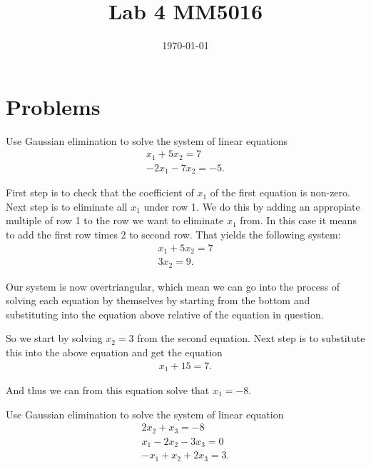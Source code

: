 \documentclass[10pt]{article}
\date{\today}
\title{Lab 4 MM5016}
\begin{document}
\maketitle


\section{Problems}
\label{sec:org0d400bd}

\begin{exercise}[System 1]  \label{exe:System_1}
Use Gaussian elimination to solve the system of linear equations
\begin{align*}
x_1 + 5x_2 = 7 \\
-2x_1 -7x_2 = -5
.
\end{align*}
\end{exercise}
\begin{solution}[]  \label{sol:}
First step is to check that the coefficient of \(x_1\) of the first
equation is non-zero.
Next step is to eliminate all \(x_1\) under row 1. We do this by
adding an appropiate multiple of row 1 to the row we
want to eliminate \(x_1\) from. In this case it means to add the first
row times 2 to second row. That yields the following system:
\begin{align*}
x_1 + 5x_2 = 7 \\
3x_2 = 9
.
\end{align*}

Our system is now overtriangular, which mean we can go into
the process of solving each equation by themselves by starting
from the bottom and substituting into the equation above
relative of the equation in question.


So we start by solving \(x_2 = 3\) from the second equation. Next step is
to substitute this into the above equation and get the equation
\begin{align*}
x_1 + 15 = 7
.
\end{align*}

And thus we can from this equation solve that \(x_1 = -8\).

\end{solution}
\begin{exercise}[System 2]  \label{exe:System_2}
Use Gaussian elimination to solve the system of linear equation
\begin{align*}
2x_2 + x_3 = -8 \\
x_1 - 2x_2 - 3x_3 = 0 \\
-x_1 + x_2 + 2x_3 = 3
.
\end{align*}
\end{exercise}
\end{document}

